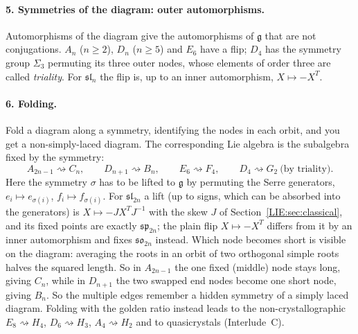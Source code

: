 \documentclass[11pt,openany]{book}
\theoremstyle{plain}
\theoremstyle{definition}
\theoremstyle{remark}
\begin{document}
\paragraph{5. Symmetries of the diagram: outer automorphisms.} Automorphisms of the diagram give the
automorphisms of $\mathfrak g$ that are not conjugations. $A_n$ ($n\ge2$), $D_n$ ($n\ge5$) and $E_6$
have a flip; $D_4$ has the symmetry group $\Sigma_3$ permuting its three outer nodes, whose elements of
order three are called \emph{triality}. For $\mathfrak{sl}_n$ the flip is, up to an inner automorphism,
$X\mapsto-X^T$.

\paragraph{6. Folding.} Fold a diagram along a symmetry, identifying the nodes in each orbit, and you
get a non-simply-laced diagram. The corresponding Lie algebra is the subalgebra fixed by the symmetry:
\[
  A_{2n-1}\rightsquigarrow C_n,\qquad D_{n+1}\rightsquigarrow B_n,\qquad E_6\rightsquigarrow F_4,\qquad
  D_4\rightsquigarrow G_2\ \text{(by triality)}.
\]
Here the symmetry $\sigma$ has to be lifted to $\mathfrak g$ by permuting the Serre generators,
$e_i\mapsto e_{\sigma(i)}$, $f_i\mapsto f_{\sigma(i)}$. For $\mathfrak{sl}_{2n}$ a lift (up to signs, which
can be absorbed into the generators) is $X\mapsto-JX^TJ^{-1}$ with the skew $J$ of
Section~\ref{LIE:sec:classical}, and its fixed points are exactly $\mathfrak{sp}_{2n}$; the plain flip
$X\mapsto-X^T$ differs from it by an inner automorphism and fixes $\mathfrak{so}_{2n}$ instead. Which
node becomes short is visible on the diagram: averaging the roots in an orbit of two orthogonal simple
roots halves the squared length. So in $A_{2n-1}$ the one fixed (middle) node stays long, giving $C_n$,
while in $D_{n+1}$ the two swapped end nodes become one short node, giving $B_n$.
So the multiple edges remember a hidden symmetry of a simply laced diagram. Folding with the golden
ratio instead leads to the non-crystallographic $E_8\rightsquigarrow H_4$, $D_6\rightsquigarrow H_3$,
$A_4\rightsquigarrow H_2$ and to quasicrystals (Interlude~C).
\end{document}
